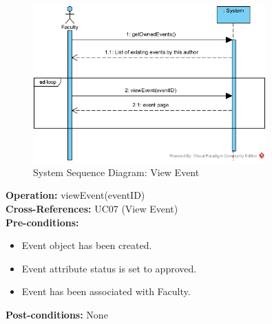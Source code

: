 \begin{figure}[H]
    \centering
    \includegraphics[width=0.8\textwidth]{images/SSD-UC07-ViewEvent.png}
    \centering
    \caption{System Sequence Diagram: View Event}
\end{figure}

\textbf{Operation:} viewEvent(eventID) \\
\textbf{Cross-References:} UC07 (View Event) \\
\textbf{Pre-conditions:}
\begin{itemize}
    \item Event object has been created.
    \item Event attribute status is set to approved.
    \item Event has been associated with Faculty.
\end{itemize}
\textbf{Post-conditions:} None \\